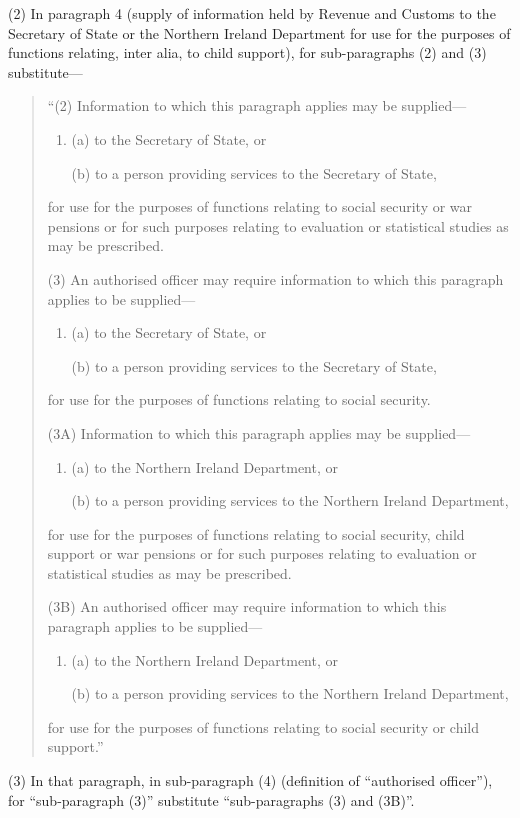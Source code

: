 \documentclass[a4paper]{article}
\begin{document}
(2) In paragraph 4 (supply of information held by Revenue and Customs to the Secretary of State or the Northern Ireland Department for use for the purposes of functions relating, inter alia, to child support), for sub-paragraphs (2) and (3) substitute—
\begin{quotation}
“(2) Information to which this paragraph applies may be supplied—
\begin{enumerate}\item[]
(a) to the Secretary of State, or

(b) to a person providing services to the Secretary of State,
\end{enumerate}
for use for the purposes of functions relating to social security or war pensions or for such purposes relating to evaluation or statistical studies as may be prescribed.

(3) An authorised officer may require information to which this paragraph applies to be supplied—
\begin{enumerate}\item[]
(a) to the Secretary of State, or

(b) to a person providing services to the Secretary of State,
\end{enumerate}
for use for the purposes of functions relating to social security.

(3A) Information to which this paragraph applies may be supplied—
\begin{enumerate}\item[]
(a) to the Northern Ireland Department, or

(b) to a person providing services to the Northern Ireland Department,
\end{enumerate}
for use for the purposes of functions relating to social security, child support or war pensions or for such purposes relating to evaluation or statistical studies as may be prescribed.

(3B) An authorised officer may require information to which this paragraph applies to be supplied—
\begin{enumerate}\item[]
(a) to the Northern Ireland Department, or

(b) to a person providing services to the Northern Ireland Department,
\end{enumerate}
for use for the purposes of functions relating to social security or child support.”
\end{quotation}

(3) In that paragraph, in sub-paragraph (4) (definition of “authorised officer”), for “sub-paragraph (3)” substitute “sub-paragraphs (3) and (3B)”.
\end{document}
